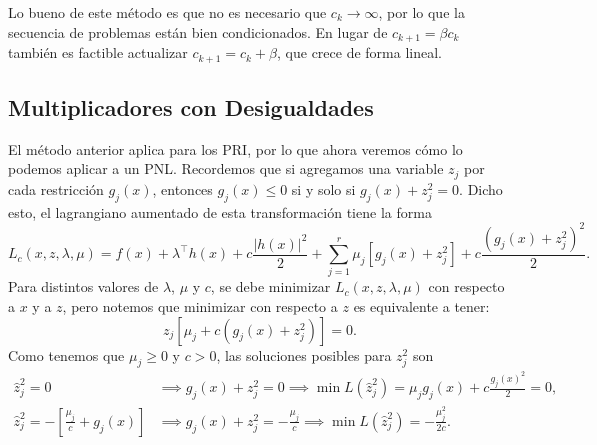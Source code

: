 Lo bueno de este método es que no es necesario que \(c_{k} \to \infty\), por lo que la secuencia de problemas están bien condicionados. En lugar de \(c_{k+1} = \beta c_{k}\) también es factible actualizar \(c_{k+1} = c_{k} + \beta\), que crece de forma lineal.

\subsection{Multiplicadores con Desigualdades}

El método anterior aplica para los PRI, por lo que ahora veremos cómo lo podemos aplicar a un PNL. Recordemos que si agregamos una variable \(z_{j}\) por cada restricción \(g_{j}(x)\), entonces \(g_{j}(x) \leq 0\) si y solo si \(g_{j}(x) + z_{j}^{2} = 0\). Dicho esto, el lagrangiano aumentado de esta transformación tiene la forma
\begin{equation*}
	L_{c}(x, z, \lambda, \mu) = f(x) + \lambda^{\top} h(x) + c \frac{\lvert h(x) \rvert^2}{2} + \sum_{j=1}^{r} \mu_{j} [g_{j}(x) + z_{j}^{2}] + c\frac{(g_{j}(x) + z_{j}^{2})^{2}}{2}.
\end{equation*}
Para distintos valores de \(\lambda\), \(\mu\) y \(c\), se debe minimizar \(L_{c}(x, z, \lambda, \mu)\) con respecto a \(x\) y a \(z\), pero notemos que minimizar con respecto a \(z\) es equivalente a tener:
\begin{equation*}
	z_{j} [\mu_{j} + c (g_{j}(x) + z_{j}^{2})] = 0.
\end{equation*}
Como tenemos que \(\mu_{j} \geq 0\) y \(c > 0\), las soluciones posibles para \(z_{j}^{2}\) son
\begin{align*}
	\hat{z}_{j}^{2} = 0								&\implies g_{j}(x) + z_{j}^{2} = 0 \implies \min L(\hat{z}_{j}^{2}) = \mu_{j} g_{j}(x) + c \frac{g_{j}(x)^{2}}{2} = 0, \\
	\hat{z}_{j}^{2} = -[\frac{\mu_{j}}{c}+g_{j}(x)]	&\implies g_{j}(x) + z_{j}^{2} = -\frac{\mu_{j}}{c} \implies \min L(\hat{z}_{j}^{2}) = -\frac{\mu_{j}^2}{2c}.
\end{align*}

